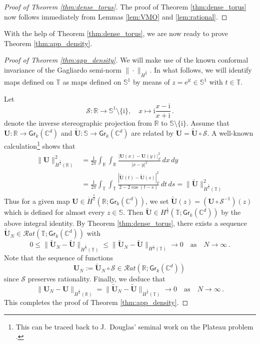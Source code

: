 \documentclass[11pt,reqno]{amsart}
\theoremstyle{definition}
\theoremstyle{remark}
\theoremstyle{remark}
\numberwithin{equation}{section}
\newcommand{\C}{\mathbb{C}}
\newcommand{\R}{\mathbb{R}}
\newcommand{\T}{\mathbb{T}}
\newcommand{\Ss}{\mathbb{S}}
\newcommand{\ii}{\mathrm{i}}
\newcommand{\eu}{\mathrm{e}}
\newcommand{\Ub}{\mathbf{U}}
\newcommand{\Gr}{\mathsf{Gr}}
\begin{document}
\begin{appendix}
\begin{proof}[Proof of Theorem \ref{thm:dense_torus}]
The proof of Theorem \ref{thm:dense_torus} now follows immediately from Lemmas \ref{lem:VMO} and \ref{lem:rational}.
\end{proof}

With the help of Theorem \ref{thm:dense_torus}, we are now ready to prove Theorem \ref{thm:app_density}.

\begin{proof}[Proof of Theorem \ref{thm:app_density}]
We will make use of the known conformal invariance of the Gagliardo semi-norm $\| \cdot \|_{\dot{H}^{\frac 1 2}}$. In what follows, we will identify maps defined on $\T$ as maps defined on $\Ss^1$ by means of $z= \eu^{\ii t} \in \Ss^1$ with $t \in \T$.

Let
$$
\mathcal{S} : \R \to \Ss^1 \setminus \{ \ii \} ,\quad x \mapsto \ii \frac{x-\ii}{x+\ii} \, .
$$
denote the inverse stereographic projection from $\R$ to $\Ss \setminus \{ \ii \}$. Assume that $\Ub : \R \to \Gr_k(\C^d)$ and $\tilde{\Ub} : \Ss \to \Gr_k(\C^d)$ are related by $\Ub = \tilde{\Ub} \circ \mathcal{S}$. A well-known calculation\footnote{This can be traced back to J.~Douglas' seminal work on the Plateau problem \cite{Do-31}.} shows that
\begin{align*}
\| \Ub \|_{\dot{H}^{\frac 1 2}(\R)}^2  & = \frac{1}{2 \pi} \int_{\R} \int_\R \frac{|\Ub(x) - \Ub(y)|_F^2}{|x-y|^2 } \, dx \, dy \\ 
& = \frac{1}{2 \pi} \int_{\T} \int_{\T} \frac{|\tilde{\Ub}(t)- \tilde{\Ub}(s)|_F^2}{2-2 \cos(t-s) } \, dt \, ds = \| \tilde{\Ub} \|_{\dot{H}^{\frac 1 2}(\T)}^2
\end{align*}
Thus for a given map $\Ub \in \dot{H}^{\frac{1}{2}}(\R; \Gr_k(\C^d))$, we set $\tilde{\Ub}(z)  = (\Ub \circ \mathcal{S}^{-1})(z)$ which is defined for almost every $z \in \Ss$. Then $\tilde{\Ub} \in H^{\frac 1 2}(\T; \Gr_k(\C^d))$ by the above integral identity. By Theorem \ref{thm:dense_torus}, there exists a sequence $\tilde{\Ub}_N \in \mathcal{R}at(\T; \Gr_k(\C^d))$ with
$$
0 \leq \| \tilde{\Ub}_N - \tilde{\Ub} \|_{\dot{H}^{\frac 1 2}(\T)} \leq  \| \tilde{\Ub}_N - \tilde{\Ub} \|_{H^{\frac 1 2}(\T)} \to 0 \quad \mbox{as} \quad N \to \infty \, .
$$
Note that the sequence of functions
$$
\Ub_N := \tilde{\Ub}_N \circ \mathcal{S} \in \mathcal{R}at(\R; \Gr_k(\C^d)) \, 
$$
since $\mathcal{S}$ preserves rationality. Finally, we deduce that
$$
\| \Ub_N - \Ub \|_{\dot{H}^{\frac 1 2}(\R)} = \| \tilde{\Ub}_N - \tilde{\Ub} \|_{\dot{H}^{\frac 1 2}(\T)} \to 0 \quad \mbox{as} \quad N \to \infty \, .
$$
This completes the proof of Theorem \ref{thm:app_density}. 
\end{proof}



\end{appendix}
\end{document}
